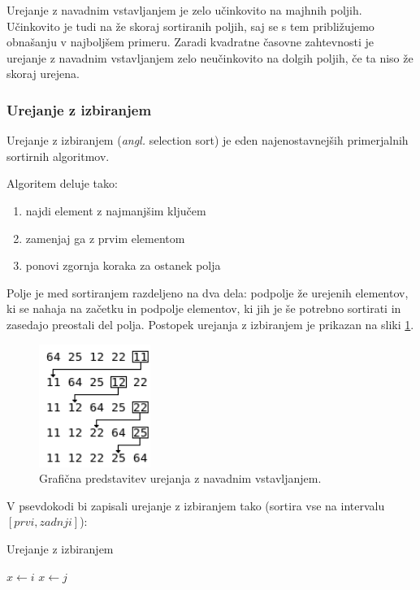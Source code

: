 \documentclass[a4paper,oneside]{article}
\begin{document}
Urejanje z navadnim vstavljanjem je zelo učinkovito na majhnih poljih. Učinkovito je tudi na že
skoraj sortiranih poljih, saj se s tem približujemo obnašanju v najboljšem primeru.
Zaradi kvadratne časovne zahtevnosti je urejanje z navadnim vstavljanjem zelo neučinkovito na
dolgih poljih, če ta niso že skoraj urejena.

\subsubsection{Urejanje z izbiranjem}
\label{chapter:selectionsort}
Urejanje z izbiranjem (\emph{angl.} selection sort) je eden najenostavnejših primerjalnih sortirnih
algoritmov.

Algoritem deluje tako:
\begin{enumerate}
  \item najdi element z najmanjšim ključem
  \item zamenjaj ga z prvim elementom
  \item ponovi zgornja koraka za ostanek polja
\end{enumerate}

Polje je med sortiranjem razdeljeno na dva dela: podpolje že urejenih elementov, ki se
nahaja na začetku in podpolje elementov, ki jih je še potrebno sortirati in zasedajo
preostali del polja.
Postopek urejanja z izbiranjem je prikazan na sliki \ref{fig:selectionsortimage}.

\begin{figure}[h]
    \begin{center}
        \includegraphics[height=40mm]{slike/selectionsort.png}
    \end{center}
    \vspace{-0.7cm}
    \caption{Grafična predstavitev urejanja z navadnim vstavljanjem.}
    \label{fig:selectionsortimage}
\end{figure}

V psevdokodi bi zapisali urejanje z izbiranjem tako (sortira vse na intervalu
$\left[prvi, zadnji\right]$):


\begin{algorithm}
  \caption{Urejanje z izbiranjem}\label{algo:selectionsort}
  \begin{algorithmic}[1]
            \State $x \gets i$
                    \State $x \gets j$
                \EndIf
            \EndFor
        \EndFor
    \EndFunction
  \end{algorithmic}
\end{algorithm}
\end{document}
